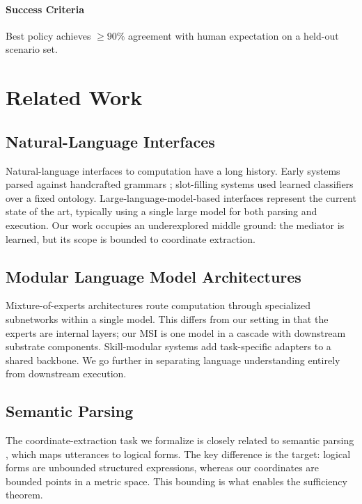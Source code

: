 \documentclass[11pt,a4paper]{article}
\theoremstyle{definition}
\theoremstyle{remark}
\begin{document}
\paragraph{Success Criteria}
Best policy achieves $\geq 90\%$ agreement with human expectation on a held-out scenario set.

\section{Related Work}
\label{sec:related}

\subsection{Natural-Language Interfaces}

Natural-language interfaces to computation have a long history. Early systems parsed against handcrafted grammars \citep{winograd1971shrdlu}; slot-filling systems used learned classifiers over a fixed ontology. Large-language-model-based interfaces \citep{brown2020gpt3, schick2024toolformer, yao2022react} represent the current state of the art, typically using a single large model for both parsing and execution. Our work occupies an underexplored middle ground: the mediator is learned, but its scope is bounded to coordinate extraction.

\subsection{Modular Language Model Architectures}

Mixture-of-experts architectures \citep{shazeer2017outrageously, fedus2022switch} route computation through specialized subnetworks within a single model. This differs from our setting in that the experts are internal layers; our MSI is one model in a cascade with downstream substrate components. Skill-modular systems \citep{houlsby2019parameter} add task-specific adapters to a shared backbone. We go further in separating language understanding entirely from downstream execution.

\subsection{Semantic Parsing}

The coordinate-extraction task we formalize is closely related to semantic parsing \citep{liang2016semantic}, which maps utterances to logical forms. The key difference is the target: logical forms are unbounded structured expressions, whereas our coordinates are bounded points in a metric space. This bounding is what enables the sufficiency theorem.
\end{document}
